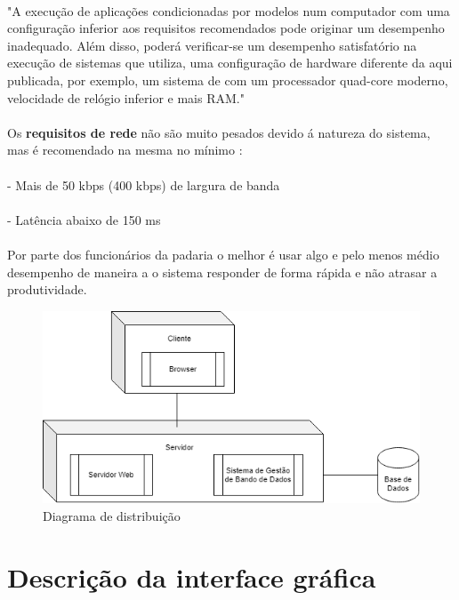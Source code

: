 \\"A execução de aplicações condicionadas por modelos num computador com uma configuração inferior aos requisitos recomendados pode originar um desempenho inadequado. Além disso, poderá verificar-se um desempenho satisfatório na execução de sistemas que utiliza, uma configuração de hardware diferente da aqui publicada, por exemplo, um sistema de com um processador quad-core moderno, velocidade de relógio inferior e mais RAM."\\
\\Os \textbf{requisitos de rede} não são muito pesados devido á natureza do sistema, mas é recomendado na mesma no mínimo :\\
\\- Mais de 50 kbps (400 kbps) de largura de banda\\
\\- Latência abaixo de 150 ms\\
\\Por parte dos funcionários da padaria o melhor é usar algo e pelo menos médio desempenho de maneira a o sistema responder de forma rápida e não atrasar a produtividade.\\

\begin{figure}[H]
	\centering
	\includegraphics[width=15cm]{Diagarama_Dist}
	\caption{Diagrama de distribuição}
	\label{fig:Diagarama_Dist}
\end{figure}


\section{Descrição da interface gráfica}

